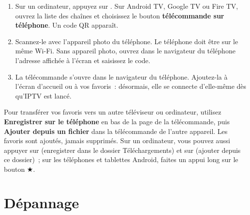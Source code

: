 \begin{enumerate}
  \item Sur un ordinateur, appuyez sur . Sur Android TV, Google TV ou
        Fire TV, ouvrez la liste des chaînes et choisissez le bouton
        \textbf{télécommande sur téléphone}. Un code QR apparaît.
  \item Scannez-le avec l'appareil photo du téléphone. Le téléphone doit être
        sur le même Wi-Fi. Sans appareil photo, ouvrez dans le navigateur du
        téléphone l'adresse affichée à l'écran et saisissez le code.
  \item La télécommande s'ouvre dans le navigateur du téléphone. Ajoutez-la à
        l'écran d'accueil ou à vos favoris~: désormais, elle se connecte
        d'elle-même dès qu'IPTV est lancé.
\end{enumerate}

Pour transférer vos favoris vers un autre téléviseur ou ordinateur, utilisez
\textbf{Enregistrer sur le téléphone} en bas de la page de la télécommande,
puis \textbf{Ajouter depuis un fichier} dans la télécommande de l'autre
appareil. Les favoris sont ajoutés, jamais supprimés. Sur un ordinateur, vous
pouvez aussi appuyer sur  (enregistrer dans le dossier
Téléchargements) et sur  (ajouter depuis ce dossier)~; sur les
téléphones et tablettes Android, faites un appui long sur le bouton
$\bigstar$.


\section{Dépannage}

